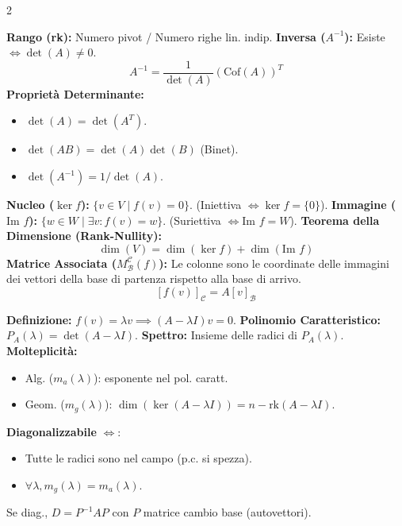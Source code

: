 \begin{multicols*}{2}
\begin{tcolorbox}[colback=lightBg, colframe=cherryRed, title={Matrici e Determinante}]
\small
\textbf{Rango (rk):} Numero pivot / Numero righe lin. indip.
\textbf{Inversa ($A^{-1}$):} Esiste $\iff \det(A) \neq 0$.
\[ A^{-1} = \frac{1}{\det(A)} (\text{Cof}(A))^T \]
\textbf{Proprietà Determinante:}
\begin{itemize}[leftmargin=*]
    \item $\det(A) = \det(A^T)$.
    \item $\det(AB) = \det(A)\det(B)$ (Binet).
    \item $\det(A^{-1}) = 1/\det(A)$.
\end{itemize}
\end{tcolorbox}

\begin{tcolorbox}[colback=white, colframe=maroon, title={Applicazioni Lineari ($f: V \to W$)}]
\small
\textbf{Nucleo ($\ker f$):} $\{ v \in V \mid f(v) = 0 \}$. (Iniettiva $\iff \ker f = \{0\}$).
\textbf{Immagine ($\text{Im } f$):} $\{ w \in W \mid \exists v: f(v)=w \}$. (Suriettiva $\iff \text{Im } f = W$).
\tcblower
\textbf{Teorema della Dimensione (Rank-Nullity):}
\[ \dim(V) = \dim(\ker f) + \dim(\text{Im } f) \]
\textbf{Matrice Associata ($M_\mathcal{B}^\mathcal{C}(f)$):}
Le colonne sono le coordinate delle immagini dei vettori della base di partenza rispetto alla base di arrivo.
\[ [f(v)]_\mathcal{C} = A [v]_\mathcal{B} \]
\end{tcolorbox}

\begin{tcolorbox}[colback=lightBg, colframe=cherryRed, title={Autovalori e Diagonalizzazione}]
\small
\textbf{Definizione:} $f(v) = \lambda v \implies (A - \lambda I)v = 0$.
\textbf{Polinomio Caratteristico:} $P_A(\lambda) = \det(A - \lambda I)$.
\textbf{Spettro:} Insieme delle radici di $P_A(\lambda)$.
\textbf{Molteplicità:}
\begin{itemize}[leftmargin=*]
    \item Alg. ($m_a(\lambda)$): esponente nel pol. caratt.
    \item Geom. ($m_g(\lambda)$): $\dim(\ker(A-\lambda I)) = n - \text{rk}(A-\lambda I)$.
\end{itemize}
\textbf{Diagonalizzabile} $\iff$:
\begin{itemize}[leftmargin=*]
    \item Tutte le radici sono nel campo (p.c. si spezza).
    \item $\forall \lambda, m_g(\lambda) = m_a(\lambda)$.
\end{itemize}
Se diag., $D = P^{-1}AP$ con $P$ matrice cambio base (autovettori).
\end{tcolorbox}


\end{multicols*}

